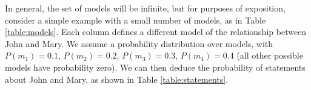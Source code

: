 \documentclass[a4paper,11pt]{article}
\renewcommand{\cite}{\citep}
\theoremstyle{definition}
\begin{document}
In general, the set of models will be infinite, but for purposes of 
exposition, consider a simple example with a small 
number of models, as in Table
\ref{table:models}. Each column defines a
different model of the relationship between John and Mary.  We
assume a probability distribution over models, with $P(m_1)
= 0.1$, $P(m_2) = 0.2$, $P(m_3) = 0.3$, $P(m_4) = 0.4$ (all other
possible models have probability zero). We can then
deduce the probability of statements about John and Mary, as shown in Table \ref{table:statements}.





\end{document}
